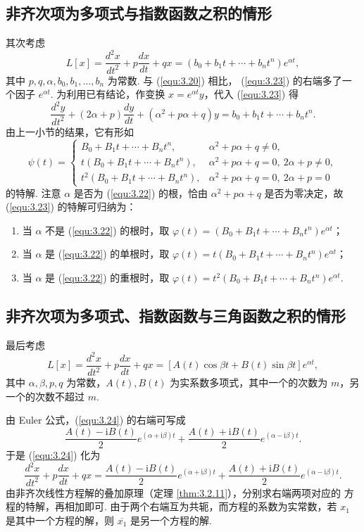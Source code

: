 \subsection{非齐次项为多项式与指数函数之积的情形}
其次考虑
\begin{equation}\label{equ:3.23}
L[x]=\frac{d^2x}{dt^2}+p\frac{dx}{dt}+qx
=\left(b_0+b_1t+\cdots+b_nt^n\right)e^{\alpha t},
\end{equation}
其中 $p,q,\alpha,b_0,b_1,\dots,b_n$ 为常数. 与 (\ref{equ:3.20}) 相比，
(\ref{equ:3.23}) 的右端多了一个因子 $e^{\alpha t}$. 为利用已有结论，作变换
$x=e^{\alpha t}y$，代入 (\ref{equ:3.23}) 得
\[
\frac{d^2y}{dt^2}+(2\alpha+p)\frac{dy}{dt}
+\left(\alpha^2+p\alpha+q\right)y=b_0+b_1t+\cdots+b_nt^n.
\]
由上一小节的结果，它有形如
\[
\psi(t)=
\begin{cases}
B_0+B_1t+\cdots+B_nt^n, & \alpha^2+p\alpha+q\neq0,\\
t\left(B_0+B_1t+\cdots+B_nt^n\right),
& \alpha^2+p\alpha+q=0,\ 2\alpha+p\neq0,\\
t^2\left(B_0+B_1t+\cdots+B_nt^n\right),
& \alpha^2+p\alpha+q=0,\ 2\alpha+p=0
\end{cases}
\]
的特解. 注意 $\alpha$ 是否为 (\ref{equ:3.22}) 的根，恰由
$\alpha^2+p\alpha+q$ 是否为零决定，故 (\ref{equ:3.23}) 的特解可归纳为：
\begin{enumerate}
\item 当 $\alpha$ 不是 (\ref{equ:3.22}) 的根时，取
$\varphi(t)=\left(B_0+B_1t+\cdots+B_nt^n\right)e^{\alpha t}$；
\item 当 $\alpha$ 是 (\ref{equ:3.22}) 的单根时，取
$\varphi(t)=t\left(B_0+B_1t+\cdots+B_nt^n\right)e^{\alpha t}$；
\item 当 $\alpha$ 是 (\ref{equ:3.22}) 的重根时，取
$\varphi(t)=t^2\left(B_0+B_1t+\cdots+B_nt^n\right)e^{\alpha t}$.
\end{enumerate}

\subsection{非齐次项为多项式、指数函数与三角函数之积的情形}
最后考虑
\begin{equation}\label{equ:3.24}
L[x]=\frac{d^2x}{dt^2}+p\frac{dx}{dt}+qx
=\left[A(t)\cos\beta t+B(t)\sin\beta t\right]e^{\alpha t},
\end{equation}
其中 $\alpha,\beta,p,q$ 为常数，$A(t),B(t)$ 为实系数多项式，其中一个的次数为
$m$，另一个的次数不超过 $m$.

由 Euler 公式，(\ref{equ:3.24}) 的右端可写成
\[
\frac{A(t)-\mathrm{i}B(t)}{2}e^{(\alpha+\mathrm{i}\beta)t}
+\frac{A(t)+\mathrm{i}B(t)}{2}e^{(\alpha-\mathrm{i}\beta)t}.
\]
于是 (\ref{equ:3.24}) 化为
\[
\frac{d^2x}{dt^2}+p\frac{dx}{dt}+qx
=\frac{A(t)-\mathrm{i}B(t)}{2}e^{(\alpha+\mathrm{i}\beta)t}
+\frac{A(t)+\mathrm{i}B(t)}{2}e^{(\alpha-\mathrm{i}\beta)t}.
\]
由非齐次线性方程解的叠加原理（定理 \ref{thm:3.2.11}），分别求右端两项对应的
方程的特解，再相加即可. 由于两个右端互为共轭，而方程的系数为实常数，若 $x_1$
是其中一个方程的解，则 $\overline{x_1}$ 是另一个方程的解.

